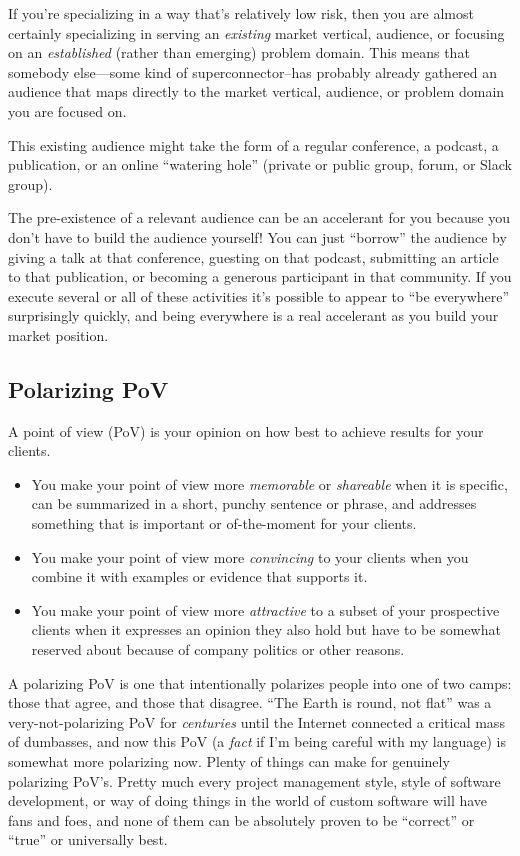 If you’re specializing in a way that’s relatively low risk, then you are almost certainly specializing in serving an \emph{existing} market vertical, audience, or focusing on an \emph{established} (rather than emerging) problem domain. This means that somebody else—some kind of superconnector--has probably already gathered an audience that maps directly to the market vertical, audience, or problem domain you are focused on.

This existing audience might take the form of a regular conference, a podcast, a publication, or an online “watering hole” (private or public group, forum, or Slack group).

The pre-existence of a relevant audience can be an accelerant for you because you don’t have to build the audience yourself! You can just “borrow” the audience by giving a talk at that conference, guesting on that podcast, submitting an article to that publication, or becoming a generous participant in that community. If you execute several or all of these activities it’s possible to appear to “be everywhere” surprisingly quickly, and being everywhere is a real accelerant as you build your market position.

\subsection{Polarizing PoV}

A point of view (PoV) is your opinion on how best to achieve results for your clients.

\begin{itemize}
\item You make your point of view more \emph{memorable} or \emph{shareable} when it is specific, can be summarized in a short, punchy sentence or phrase, and addresses something that is important or of-the-moment for your clients.
\item You make your point of view more \emph{convincing} to your clients when you combine it with examples or evidence that supports it.
\item You make your point of view more \emph{attractive} to a subset of your prospective clients when it expresses an opinion they also hold but have to be somewhat reserved about because of company politics or other reasons.
\end{itemize}

A polarizing PoV is one that intentionally polarizes people into one of two camps: those that agree, and those that disagree. “The Earth is round, not flat” was a very-not-polarizing PoV for \emph{centuries} until the Internet connected a critical mass of dumbasses, and now this PoV (a \emph{fact} if I’m being careful with my language) is somewhat more polarizing now. Plenty of things can make for genuinely polarizing PoV’s. Pretty much every project management style, style of software development, or way of doing things in the world of custom software will have fans and foes, and none of them can be absolutely proven to be “correct” or “true” or universally best.

